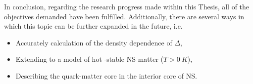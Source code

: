 In conclusion, regarding the research progress made within this Thesis, all of the objectives demanded have been fulfilled. Additionally, there are several ways in which this topic can be further expanded in the future, i.e.
\begin{itemize}
    \item Accurately calculation of the density dependence of $\Delta$,
    \item Extending to a model of hot \textbeta-stable \gls{NS} matter ($T>0\:K$),
    \item Describing the quark-matter core in the interior core of \gls{NS}.
\end{itemize}
